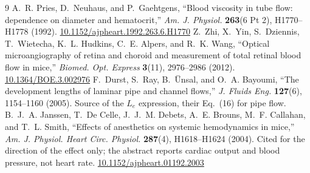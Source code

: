 \documentclass[11pt,a4paper]{article}
\begin{document}
\begin{thebibliography}{9}
 A.~R. Pries, D.~Neuhaus, and P.~Gaehtgens, ``Blood viscosity in tube flow: dependence on diameter and hematocrit,'' \textit{Am. J. Physiol.} \textbf{263}(6 Pt 2), H1770--H1778 (1992). \href{https://doi.org/10.1152/ajpheart.1992.263.6.H1770}{10.1152/ajpheart.1992.263.6.H1770}
 Z.~Zhi, X.~Yin, S.~Dziennis, T.~Wietecha, K.~L. Hudkins, C.~E. Alpers, and R.~K. Wang, ``Optical microangiography of retina and choroid and measurement of total retinal blood flow in mice,'' \textit{Biomed. Opt. Express} \textbf{3}(11), 2976--2986 (2012). \href{https://doi.org/10.1364/BOE.3.002976}{10.1364/BOE.3.002976}
 F.~Durst, S.~Ray, B.~\"Unsal, and O.~A. Bayoumi, ``The development lengths of laminar pipe and channel flows,'' \textit{J. Fluids Eng.} \textbf{127}(6), 1154--1160 (2005). Source of the $L_e$ expression, their Eq.~(16) for pipe flow.
 B.~J.~A. Janssen, T.~De Celle, J.~J.~M. Debets, A.~E. Brouns, M.~F. Callahan, and T.~L. Smith, ``Effects of anesthetics on systemic hemodynamics in mice,'' \textit{Am. J. Physiol. Heart Circ. Physiol.} \textbf{287}(4), H1618--H1624 (2004). Cited for the direction of the effect only; the abstract reports cardiac output and blood pressure, not heart rate. \href{https://doi.org/10.1152/ajpheart.01192.2003}{10.1152/ajpheart.01192.2003}
\end{thebibliography}
\end{document}
